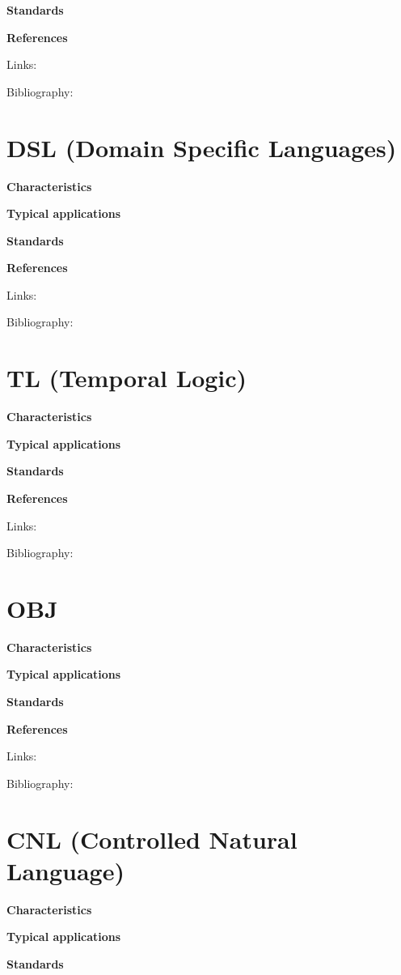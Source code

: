 \documentclass{./template/openetcs2}
\begin{document}
	\textbf{Standards}


	\textbf{References}

Links:



Bibliography:

\section{DSL (Domain Specific Languages)}


	\textbf{Characteristics}


	\textbf{Typical applications}


	\textbf{Standards}


	\textbf{References}

Links:



Bibliography:

\section{TL (Temporal Logic)}


	\textbf{Characteristics}


	\textbf{Typical applications}


	\textbf{Standards}


	\textbf{References}

Links:



Bibliography:

\section{OBJ}


	\textbf{Characteristics}


	\textbf{Typical applications}


	\textbf{Standards}


	\textbf{References}

Links:



Bibliography:

\section{CNL (Controlled Natural Language)}


	\textbf{Characteristics}


	\textbf{Typical applications}


	\textbf{Standards}
\end{document}
